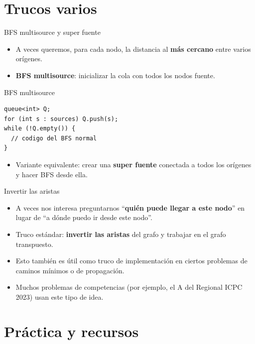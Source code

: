 \documentclass[aspectratio=169]{beamer}
\begin{document}
\section{Trucos varios}

\begin{frame}[fragile]{BFS multisource y super fuente}
  \begin{itemize}
    \item A veces queremos, para cada nodo, la distancia al \textbf{más cercano} entre varios orígenes.
    \item \textbf{BFS multisource}: inicializar la cola con todos los nodos fuente.
  \end{itemize}
  \begin{block}{BFS multisource}
  \begin{lstlisting}[style=customc]
queue<int> Q;
for (int s : sources) Q.push(s);
while (!Q.empty()) {
  // codigo del BFS normal
}
  \end{lstlisting}
  \end{block}
  \begin{itemize}
    \item Variante equivalente: crear una \textbf{super fuente} conectada a todos los orígenes y hacer BFS desde ella.
  \end{itemize}
\end{frame}

\begin{frame}{Invertir las aristas}
  \begin{itemize}
    \item A veces nos interesa preguntarnos ``\textbf{quién puede llegar a este nodo}'' en lugar de ``a dónde puedo ir desde este nodo''.
    \item Truco estándar: \textbf{invertir las aristas} del grafo y trabajar en el grafo transpuesto.
    \item Esto también es útil como truco de implementación en ciertos problemas de caminos mínimos o de propagación.
    \item Muchos problemas de competencias (por ejemplo, el A del Regional ICPC 2023) usan este tipo de idea.
  \end{itemize}
\end{frame}

\section*{Práctica y recursos}
\end{document}
